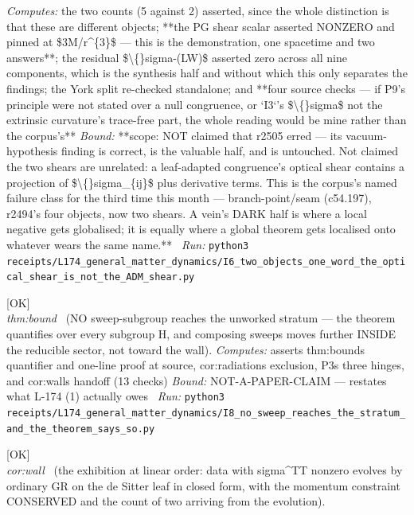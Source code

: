 \begin{description}
\emph{Computes:} the two counts (5 against 2) asserted, since the whole distinction is that these are different objects; **the PG shear scalar asserted NONZERO and pinned at \$3M/r\textasciicircum{}\{3\}\$ --- this is the demonstration, one spacetime and two answers**; the residual \$\textbackslash\{\}sigma-(LW)\$ asserted zero across all nine components, which is the synthesis half and without which this only separates the findings; the York split re-checked standalone; and **four source checks --- if P9's principle were not stated over a null congruence, or `I3`'s \$\textbackslash\{\}sigma\$ not the extrinsic curvature's trace-free part, the whole reading would be mine rather than the corpus's**
 \emph{Bound:} **scope: NOT claimed that r2505 erred --- its vacuum-hypothesis finding is correct, is the valuable half, and is untouched. Not claimed the two shears are unrelated: a leaf-adapted congruence's optical shear contains a projection of \$\textbackslash\{\}sigma\_\{ij\}\$ plus derivative terms.  This is the corpus's named failure class for the third time this month --- branch-point/seam (c54.197), r2494's four objects, now two shears. A vein's DARK half is where a local negative gets globalised; it is equally where a global theorem gets localised onto whatever wears the same name.**
\ \emph{Run:} \texttt{python3 receipts/L174\_general\_matter\_dynamics/I6\_two\_objects\_one\_word\_the\_optical\_shear\_is\_not\_the\_ADM\_shear.py}
\item[\label{rcpt:I8_no_sweep_reaches_the_stratum_and_the_theorem_says_so}\texttt{I8\_no\_sweep\_reaches\_the\_stratum\_and\_the\_theorem\_says\_so}]\hfill\textsf{[OK]}\\
\textit{thm:bound} \ (NO sweep-subgroup reaches the unworked stratum --- the theorem quantifies over every subgroup H, and composing sweeps moves further INSIDE the reducible sector, not toward the wall). 
\emph{Computes:} asserts thm:bounds quantifier and one-line proof at source, cor:radiations exclusion, P3s three hinges, and cor:walls handoff (13 checks)
 \emph{Bound:} NOT-A-PAPER-CLAIM --- restates what L-174 (1) actually owes
\ \emph{Run:} \texttt{python3 receipts/L174\_general\_matter\_dynamics/I8\_no\_sweep\_reaches\_the\_stratum\_and\_the\_theorem\_says\_so.py}
\item[\label{rcpt:I9_the_stratum_evolves_by_ordinary_GR_at_linear_order}\texttt{I9\_the\_stratum\_evolves\_by\_ordinary\_GR\_at\_linear\_order}]\hfill\textsf{[OK]}\\
\textit{cor:wall} \ (the exhibition at linear order: data with sigma\textasciicircum{}TT nonzero evolves by ordinary GR on the de Sitter leaf in closed form, with the momentum constraint CONSERVED and the count of two arriving from the evolution). 

\end{description}
